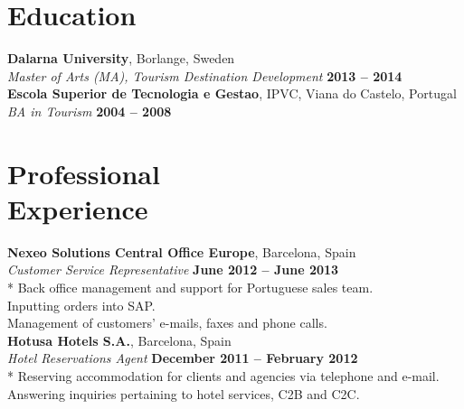 \documentclass[margin,line]{resume}
\begin{document}
\begin{resume}
    \section{\mysidestyle Education}
    \textbf{Dalarna University}, Borlange, Sweden \vspace{2mm}\\\vspace{1mm}%
    \textsl{Master of Arts (MA), Tourism Destination Development}\hfill \textbf{ 2013 -- 2014}\\
    \textbf{Escola Superior de Tecnologia e Gestao}, IPVC, Viana do Castelo, Portugal \vspace{2mm}\\\vspace{1mm}%
    \textsl{BA in Tourism}\hfill \textbf{ 2004 -- 2008}\\


    \section{\mysidestyle Professional\\Experience}
    \textbf{Nexeo Solutions Central Office Europe}, Barcelona, Spain \vspace{2mm}\\\vspace{1mm}%
    \textsl{Customer Service Representative} \hfill \textbf{June 2012 -- June 2013}\\*
    Back office management and support for Portuguese sales team. \vspace{1mm}\\%
    Inputting orders into SAP. \vspace{1mm}\\%
    Management of customers' e-mails, faxes and phone calls. \vspace{1mm}\\%
    
    \textbf{Hotusa Hotels S.A.}, Barcelona, Spain \vspace{2mm}\\\vspace{1mm}%
    \textsl{Hotel Reservations Agent} \hfill \textbf{December 2011 -- February 2012}\\*
    Reserving accommodation for clients and agencies via telephone and e-mail. \vspace{1mm}\\%
    Answering inquiries pertaining to hotel services, C2B and C2C. \vspace{1mm}\\%
    

\end{resume}
\end{document}
